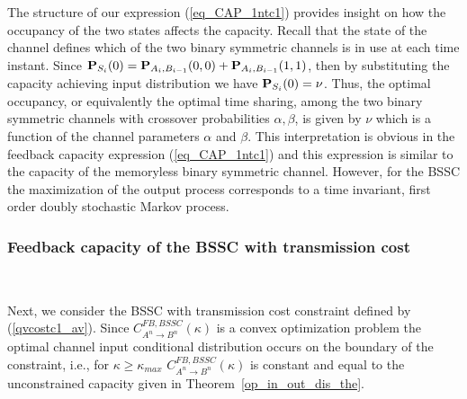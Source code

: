 \documentclass[11pt, a4paper, journal,onecolumn]{IEEEtran}
\newcommand{\rar}{\rightarrow}
\begin{document}
\par The structure of our expression  (\ref{eq_CAP_1ntc1}) provides  insight on how the occupancy of the two states affects the capacity. Recall that the state of the channel defines which of the two binary symmetric channels is in use at each time instant. Since  ${\bf P}_{S_i}(0)={\bf P}_{A_i,B_{i{-}1}}(0,0)+{\bf P}_{A_i,B_{i{-}1}}(1,1)$, then by substituting the capacity achieving input distribution we have ${\bf P}_{S_i}(0)=\nu$.
Thus, the optimal occupancy, or equivalently the optimal time sharing, among the two binary symmetric channels with crossover probabilities $\alpha,\beta$, is given by $\nu$ which is a function of the channel parameters $\alpha$ and $\beta$. This interpretation is obvious in the feedback capacity expression (\ref{eq_CAP_1ntc1}) and this expression is similar to the capacity of the memoryless binary symmetric channel. However, for the BSSC the maximization of the output process corresponds to a time invariant, first order  doubly stochastic Markov process.


%

\subsubsection{Feedback capacity of the BSSC with transmission cost} \ \\
\par Next, we consider the BSSC with transmission cost constraint defined by (\ref{qvcostc1_av}). Since $C^{FB, BSSC}_{A^n \rar B^n}(\kappa)$ is a convex optimization problem the optimal channel input conditional distribution occurs on the boundary of the constraint, i.e., for $\kappa\geq \kappa_{max}$ $C^{FB, BSSC}_{A^n \rar B^n}(\kappa)$ is constant and equal to the unconstrained capacity given in Theorem~\ref{op_in_out_dis_the}.\\
 
\end{document}
